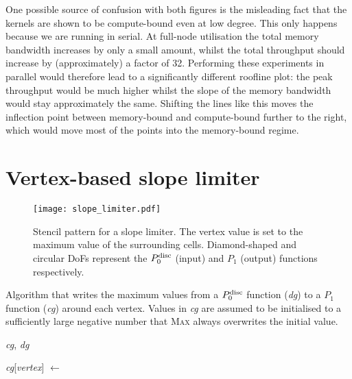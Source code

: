 \documentclass[thesis]{subfiles}
\begin{document}
One possible source of confusion with both figures is the misleading fact that the kernels are shown to be compute-bound even at low degree.
This only happens because we are running in serial.
At full-node utilisation the total memory bandwidth increases by only a small amount, whilst the total throughput should increase by (approximately) a factor of 32.
Performing these experiments in parallel would therefore lead to a significantly different roofline plot: the peak throughput would be much higher whilst the slope of the memory bandwidth would stay approximately the same.
Shifting the lines like this moves the inflection point between memory-bound and compute-bound further to the right, which would move most of the points into the memory-bound regime.

\section{Vertex-based slope limiter}
\label{sec:demo_apps_slope_limiter}

\begin{figure}
  \centering
  \texttt{[image: slope\_limiter.pdf]}
  \caption{
    Stencil pattern for a slope limiter.
    The vertex value is set to the maximum value of the surrounding cells.
    Diamond-shaped and circular DoFs represent the $P_0^\textnormal{disc}$ (input) and $P_1$ (output) functions respectively.
  }
  \label{fig:slope_limiter_stencil}
\end{figure}

\begin{algorithm}
  \caption{
    Algorithm that writes the maximum values from a $P_0^\textnormal{disc}$ function (\textit{dg}) to a $P_1$ function (\textit{cg}) around each vertex.
    Values in \textit{cg} are assumed to be initialised to a sufficiently large negative number that \textsc{Max} always overwrites the initial value.
  }

  \begin{algorithmic}[1]
    \Require \textit{cg}, \textit{dg} 

       
        \State \textit{cg}[\textit{vertex}] $\gets$ 
      \EndFor
    \EndFor
  \end{algorithmic}
  \label{alg:slope_limiter}
\end{algorithm}
\end{document}
